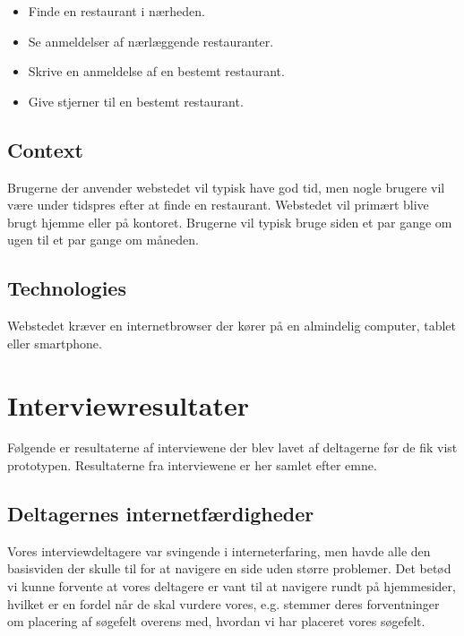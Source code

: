 \documentclass[a4paper, 12pt]{article}
\begin{document}
\begin{itemize}
\item Finde en restaurant i nærheden.
\item Se anmeldelser af nærlæggende restauranter.
\item Skrive en anmeldelse af en bestemt restaurant.
\item Give stjerner til en bestemt restaurant.
\end{itemize}

\subsection{Context}

Brugerne der anvender webstedet vil typisk have god tid, men nogle
brugere vil være under tidspres efter at finde en
restaurant. Webstedet vil primært blive brugt hjemme eller på
kontoret.  Brugerne vil typisk bruge siden et par gange om ugen til et
par gange om måneden.

\subsection{Technologies}

Webstedet kræver en internetbrowser der kører på en almindelig computer, tablet
eller smartphone.

\section{Interviewresultater}
\label{sec:Interviewresultater}
Følgende er resultaterne af interviewene der blev lavet af deltagerne før de fik vist prototypen.
Resultaterne fra interviewene er her samlet efter emne.

\subsection{Deltagernes internetfærdigheder}

Vores interviewdeltagere var svingende i interneterfaring, men havde alle den basisviden
der skulle til for at navigere en side uden større problemer. Det betød vi kunne
forvente at vores deltagere er vant til at navigere rundt på hjemmesider, hvilket
er en fordel når de skal vurdere vores, e.g. stemmer deres forventninger om
placering af søgefelt overens med, hvordan vi har placeret vores søgefelt.


\end{document}
